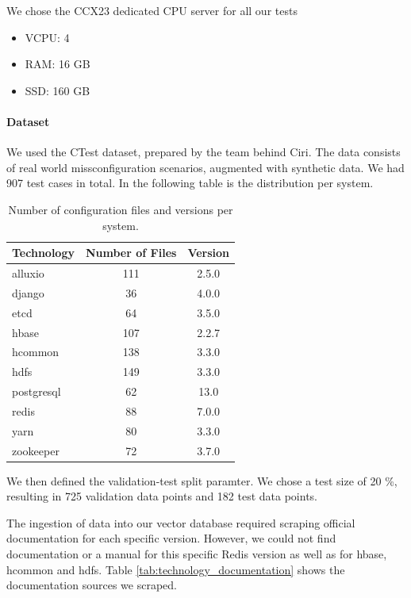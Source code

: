 We chose the CCX23 dedicated CPU server\cite{hetzner-online-gmbh-2025} for all our tests
\begin{itemize}
    \item VCPU: 4
    \item RAM: 16 GB
    \item SSD: 160 GB
\end{itemize}

\paragraph{Dataset} 
We used the CTest dataset, prepared by the team behind Ciri\cite{Lian.2024}\cite{xlab-uiuc-2025}. The data consists of real world missconfiguration scenarios, augmented with synthetic data. We had 907 test cases in total. In the following table is the distribution per system.

\begin{table}[h]
    \centering
    \begin{tabular}{|l|c|c|}
        \hline
        \textbf{Technology} & \textbf{Number of Files} & \textbf{Version} \\
        \hline
        alluxio & 111 & 2.5.0 \\
        django & 36 & 4.0.0 \\
        etcd & 64 & 3.5.0 \\
        hbase & 107 & 2.2.7 \\
        hcommon & 138 & 3.3.0 \\
        hdfs & 149 & 3.3.0 \\
        postgresql & 62 & 13.0 \\
        redis & 88 & 7.0.0 \\
        yarn & 80 & 3.3.0 \\
        zookeeper & 72 & 3.7.0 \\
        \hline
    \end{tabular}
    \caption{Number of configuration files and versions per system.}
    \label{tab:technology_values}
\end{table}

We then defined the validation-test split paramter. We chose a test size of 20 \%, resulting in 725 validation data points and 182 test data points.  

The ingestion of data into our vector database required scraping official documentation for each specific version. However, we could not find documentation or a manual for this specific Redis version as well as for hbase, hcommon and hdfs. Table \ref{tab:technology_documentation} shows the documentation sources we scraped.

